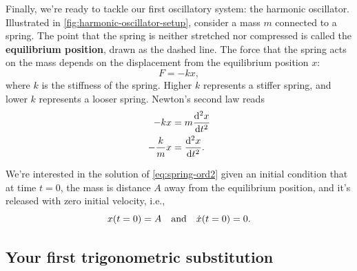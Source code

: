 Finally, we're ready to tackle our first oscillatory system: the harmonic oscillator. Illustrated in \cref{fig:harmonic-oscillator-setup}, consider a mass \(m\) connected to a spring. The point that the spring is neither stretched nor compressed is called the \textbf{equilibrium position}, drawn as the dashed line. The force that the spring acts on the mass depends on the displacement from the equilibrium position \(x\):
\begin{equation}
  F = -kx,
\end{equation}
where \(k\) is the stiffness of the spring. Higher \(k\) represents a stiffer spring, and lower \(k\) represents a looser spring. Newton's second law reads
\begin{align}
  -kx           & = m\odv[ord = 2]{x}{t}                        \\
  -\frac{k}{m}x & = \odv[ord = 2]{x}{t}. \label{eq:spring-ord2}
\end{align}

We're interested in the solution of \cref{eq:spring-ord2} given an initial condition that at time \(t = 0\), the mass is distance \(A\) away from the equilibrium position, and it's released with zero initial velocity, i.e.,
\begin{equation}
  x(t = 0) = A \quad\textrm{and}\quad \dot{x}(t = 0) = 0. \label{eq:spring-initial-condition}
\end{equation}

\subsection{Your first trigonometric substitution}

